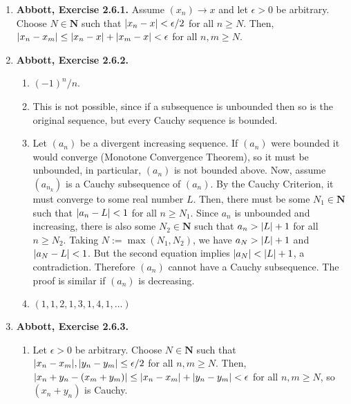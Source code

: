 \documentclass{article}
\DeclarePairedDelimiter\abs{\lvert}{\rvert}
\newcommand{\N}{\mathbf{N}}
\newcommand{\exc}[2][Abbott]{\item \textbf{#1, Exercise #2.}}
\newcommand{\lep}[1][L]{#1et $\epsilon > 0$ be arbitrary}
\let\oldmax\max
\renewcommand{\max}[1]{\oldmax \left( #1 \right)}
\begin{document}
\begin{enumerate}
    To see that $(a_{n_k}) \to 0$, \lep[l]. Choose $N \in \N$ such that $N > 1/\epsilon$. Since $s-1/k < a_{n_k} \leq s+1/k$ for every $k \in \N$, then $\abs*{a_{n_k} - s} \leq 1/k$. Letting $k \geq N$, we have $\abs*{a_{n_k}-s} \leq 1/k < \epsilon$, and we are done.

    \exc{2.6.1}
    Assume $(x_n) \to x$ and \lep[l]. Choose $N \in \N$ such that $\abs*{x_n-x} < \epsilon/2$ for all $n \geq N$. Then, $\abs*{x_n-x_m} \leq \abs*{x_n-x} + \abs*{x_m-x} < \epsilon$ for all $n,m \geq N$.
    
    \exc{2.6.2}
    \begin{enumerate}
        \item $(-1)^n/n$.
        
        \item This is not possible, since if a subsequence is unbounded then so is the original sequence, but every Cauchy sequence is bounded.
        
        \item Let $(a_n)$ be a divergent increasing sequence. If $(a_n)$ were bounded it would converge (Monotone Convergence Theorem), so it must be unbounded, in particular, $(a_n)$ is not bounded above. Now, assume $(a_{n_k})$ is a Cauchy subsequence of $(a_n)$. By the Cauchy Criterion, it must converge to some real number $L$. Then, there must be some $N_1 \in \N$ such that $\abs*{a_n - L} < 1$ for all $n \geq N_1$. Since $a_n$ is unbounded and increasing, there is also some $N_2 \in \N$ such that $a_n > \abs*{L}+1$ for all $n \geq N_2$. Taking $N := \max{N_1, N_2}$, we have $a_N > \abs*{L} + 1$ and $\abs*{a_N-L} < 1$. But the second equation implies $\abs*{a_N} < \abs*{L} + 1$, a contradiction. Therefore $(a_n)$ cannot have a Cauchy subsequence. The proof is similar if $(a_n)$ is decreasing.
        
        \item $(1, 1, 2, 1, 3, 1, 4, 1, \dots)$
    \end{enumerate}
    
    \exc{2.6.3}
    \begin{enumerate}
        \item \lep. Choose $N \in \N$ such that 
         $\abs*{x_n-x_m}, \abs*{y_n-y_m} \leq \epsilon/2$ for all $n,m \geq N$. Then, $\abs*{x_n+y_n-(x_m+y_m)} \leq \abs*{x_n-x_m} + \abs*{y_n-y_m} < \epsilon$ for all $n,m \geq N$, so $(x_n + y_n)$ is Cauchy.
        

\end{enumerate}
\end{enumerate}
\end{document}
